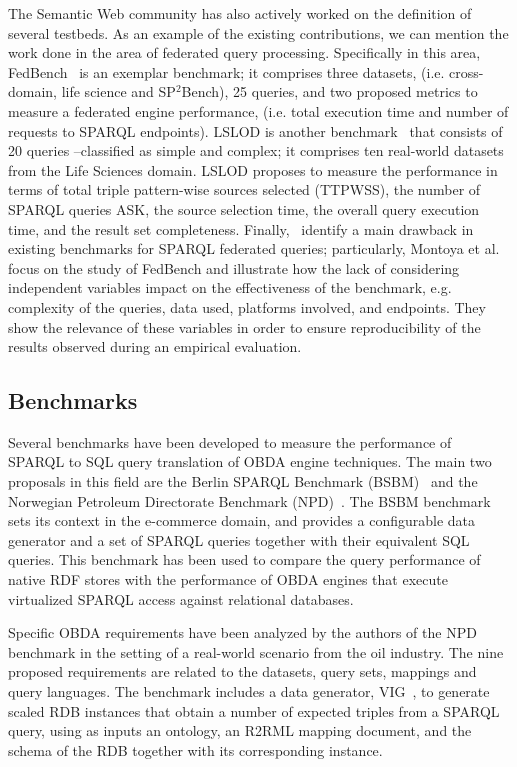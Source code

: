 The Semantic Web community has also actively worked on the definition of several testbeds. As an example of the existing contributions, we can mention the work done in the area of federated query processing. Specifically in this area, FedBench~\citep{schmidt2011fedbench} is an exemplar benchmark; it comprises three datasets, (i.e. cross-domain, life science and SP$^2$Bench), 25 queries, and two proposed metrics to measure a federated engine performance, (i.e. total execution time and number of requests to SPARQL endpoints). LSLOD is another benchmark~\citep{hasnain2017biofed} that consists of 20 queries --classified as simple and complex; it comprises ten real-world datasets from the Life Sciences domain. LSLOD proposes to measure the performance in terms of total triple pattern-wise sources selected (TTPWSS), the number of SPARQL queries ASK, the source selection time, the overall query execution time, and the result set completeness. Finally,~\citep{montoya2012benchmarking} identify a main drawback in existing benchmarks for SPARQL federated queries; particularly, Montoya et al. focus on the study of FedBench and illustrate how the lack of considering independent variables impact on the effectiveness of the benchmark, e.g. complexity of the queries, data used, platforms involved, and endpoints. They show the relevance of these variables in order to ensure reproducibility of the results observed during an empirical evaluation. 

\subsection{Benchmarks}
Several benchmarks have been developed to measure the performance of SPARQL to SQL query translation of OBDA engine techniques. The main two proposals in this field are the Berlin SPARQL Benchmark (BSBM)~\citep{bizer2009berlin} and the Norwegian Petroleum Directorate Benchmark (NPD)~\cite{lanti2015npd}. The BSBM benchmark sets its context in the e-commerce domain, and provides a configurable data generator and a set of SPARQL queries together with their equivalent SQL queries. This benchmark has been used to compare the query performance of native RDF stores with the performance of OBDA engines that execute virtualized SPARQL access against relational databases.



Specific OBDA requirements have been analyzed by the authors of the NPD benchmark in the setting of a real-world scenario from the oil industry. The nine proposed requirements are related to the datasets, query sets, mappings and query languages. The benchmark includes a data generator, VIG~\citep{lantivig}, to generate scaled RDB instances that obtain a number of expected triples from a SPARQL query, using as inputs an ontology, an R2RML mapping document, and the schema of the RDB together with its corresponding instance. 

